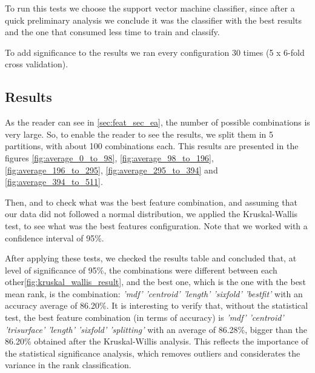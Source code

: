 \documentclass[12pt,a4paper]{report}
\begin{document}
		To run this tests we choose the support vector machine classifier, since after a quick preliminary analysis we conclude it was the classifier with the best results and the one that consumed less time to train and classify. 
		
		To add significance to the results we ran every configuration 30 times (5 x 6-fold cross validation).
			
				\subsection{Results}
				As the reader can see in \ref{sec:feat_sec_ea}, the number of possible combinations is very large. So, to enable the reader to see the results, we split them in 5 partitions, with about 100 combinations each. This results are presented in the figures \ref{fig:average_0_to_98}, \ref{fig:average_98_to_196}, \ref{fig:average_196_to_295}, \ref{fig:average_295_to_394} and \ref{fig:average_394_to_511}.
				
				
				
				
				Then, and to check what was the best feature combination, and assuming that our data did not followed a normal distribution, we applied the Kruskal-Wallis test, to see what was the best features configuration. Note that we worked with a confidence interval of 95\%.
				
				After applying these tests, we checked the results table and concluded that, at level of significance of 95\%, the combinations were different between each other\ref{fig:kruskal_wallis_result}, and the best one, which is the one with the best mean rank, is the combination:  \emph{'mdf' 'centroid' 'length' 'sixfold' 'bestfit'} with an accuracy average of 86.20\%. It is interesting to verify that, without the statistical test, the best feature combination (in terms of accuracy) is \emph{'mdf' 'centroid' 'trisurface' 'length' 'sixfold' 'splitting'} with an average of 86.28\%, bigger than the 86.20\% obtained after the Kruskal-Willis analysis. This reflects the importance of the statistical significance analysis, which removes outliers and considerates the variance in the rank classification.
				
\end{document}
